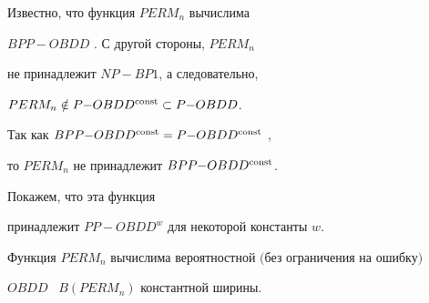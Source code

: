 




Известно, что функция $PERM_n$ вычислима


$BPP{-}OBDD$ \cite{S98}. С другой стороны, $PERM_n$


не принадлежит $NP{-}BP1$, а следовательно,


$PERM_n\notin P{-}OBDD^{\operatorname{const}}\subset P{-}OBDD$.


Так как $BPP{-}OBDD^{\operatorname{const}}=P{-}OBDD^{\operatorname{const}}$ \cite{KM99a},


то $PERM_n$ не принадлежит $BPP{-}OBDD^{\operatorname{const}}$.


Покажем, что эта функция


принадлежит $PP{-}OBDD^w$ для некоторой константы $w$.








\begin{thm}


Функция $PERM_n$ вычислима вероятностной $($без ограничения на ошибку\/$)$


$OBDD$ \ $B(PERM_n)$ константной ширины.


\end{thm}








